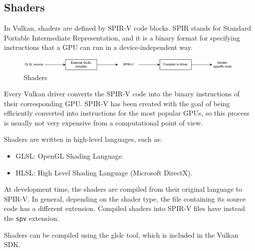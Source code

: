 \subsection{Shaders}
In Vulkan, shaders are defined by SPIR-V code blocks. 
SPIR stands for Standard Portable Intermediate Representation, and it is a binary format for specifying instructions that a GPU can run in a device-independent way.
\begin{figure}[H]
    \centering
    \includegraphics[width=1\linewidth]{images/shaders.png}
    \caption{Shaders}
\end{figure}
Every Vulkan driver converts the SPIR-V code into the binary instructions of their corresponding GPU.\@ 
SPIR-V has been created with the goal of being efficiently converted into instructions for the most popular GPUs, so this process is usually not very expensive from a computational point of view.

Shaders are written in high-level languages, such as:
\begin{itemize}
    \item GLSL\@: OpenGL Shading Language.
    \item HLSL\@: High Level Shading Language (Microsoft DirectX).
\end{itemize}
At development time, the shaders are compiled from their original language to SPIR-V. 
In general, depending on the shader type, the file containing its source code has a different extension. 
Compiled shaders into SPIR-V files have instead the \texttt{spv} extension.

Shaders can be compiled using the glslc tool, which is included in the Vulkan SDK.\@

